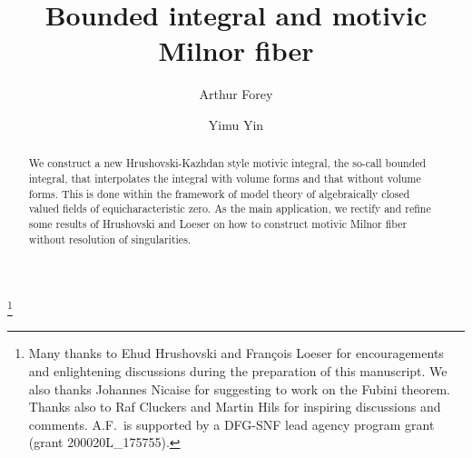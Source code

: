 \documentclass[12pt]{amsart}
\theoremstyle{plain}
\theoremstyle{definition}
\theoremstyle{remark}
\numberwithin{equation}{section}
\theoremstyle{plain}
\newcommand{\0}{\emptyset}
\begin{document}
\title[Bounded integral and motivic Milnor fiber]{Bounded integral and motivic Milnor fiber}

\author[Arthur Forey]{Arthur Forey}
\address[A. Forey]{D-MATH, ETH Z\"urich, R\"amistrasse 101, CH-8092 Z\"urich, Switzerland}

\author[Yimu Yin]{Yimu Yin}
\address[Y. Yin]{Pasadena, California}

\thanks{Many thanks to Ehud Hrushovski and Fran\c cois Loeser for encouragements and enlightening discussions during the preparation of this manuscript. We also thanks Johannes Nicaise for suggesting to work on the Fubini theorem. Thanks also to Raf Cluckers and Martin Hils for inspiring discussions and comments. A.F.\ is supported by a DFG-SNF lead agency program grant
  (grant 200020L\_175755). }




\begin{abstract}
We construct a new Hrushovski-Kazhdan style motivic integral, the so-call bounded integral, that interpolates the integral with volume forms and that without volume forms. This is done within the framework of model theory of algebraically closed valued fields of equicharacteristic zero. As the main application, we rectify and refine some results of Hrushovski and Loeser on how to construct motivic Milnor fiber without resolution of singularities.
\end{abstract}



\maketitle
\end{document}
